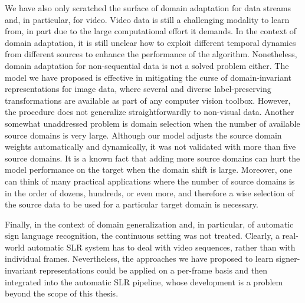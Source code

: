 We have also only scratched the surface of domain adaptation for data streams and, in particular, for video. Video data is still a challenging modality to learn from, in part due to the large computational effort it demands. In the context of domain adaptation, it is still unclear how to exploit different temporal dynamics from different sources to enhance the performance of the algorithm. Nonetheless, domain adaptation for non-sequential data is not a solved problem either. The model we have proposed is effective in mitigating the curse of domain-invariant representations for image data, where several and diverse label-preserving transformations are available as part of any computer vision toolbox. However, the procedure does not generalize straightforwardly to non-visual data. Another somewhat unaddressed problem is domain selection when the number of available source domains is very large. Although our model adjusts the source domain weights automatically and dynamically, it was not validated with more than five source domains. It is a known fact that adding more source domains can hurt the model performance on the target when the domain shift is large. Moreover, one can think of many practical applications where the number of source domains is in the order of dozens, hundreds, or even more, and therefore a wise selection of the source data to be used for a particular target domain is necessary.

Finally, in the context of domain generalization and, in particular, of automatic sign language recognition, the continuous setting was not treated. Clearly, a real-world automatic SLR system has to deal with video sequences, rather than with individual frames. Nevertheless, the approaches we have proposed to learn signer-invariant representations could be applied on a per-frame basis and then integrated into the automatic SLR pipeline, whose development is a problem beyond the scope of this thesis.